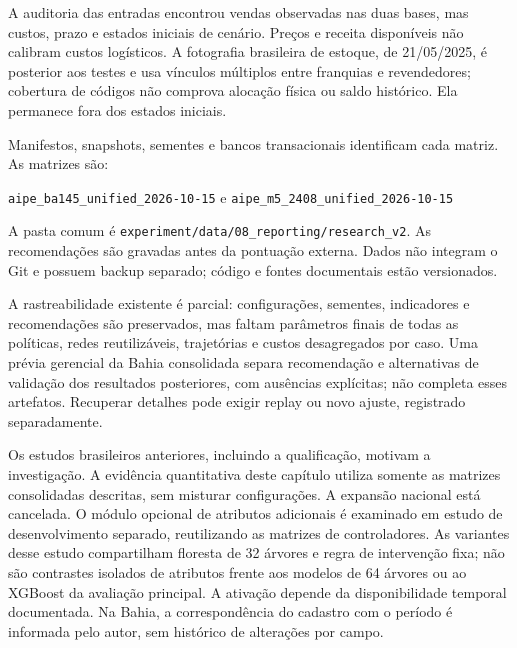 A auditoria das entradas encontrou vendas observadas nas duas bases, mas custos, prazo e estados iniciais de cenário. Preços e receita disponíveis não calibram custos logísticos. A fotografia brasileira de estoque, de 21/05/2025, é posterior aos testes e usa vínculos múltiplos entre franquias e revendedores; cobertura de códigos não comprova alocação física ou saldo histórico. Ela permanece fora dos estados iniciais.

Manifestos, snapshots, sementes e bancos transacionais identificam cada matriz. As matrizes são:\par\begingroup\small\raggedright \nolinkurl{aipe_ba145_unified_2026-10-15} e
\nolinkurl{aipe_m5_2408_unified_2026-10-15}\par\endgroup
A pasta comum é \nolinkurl{experiment/data/08_reporting/research_v2}. As recomendações são gravadas antes da pontuação externa. Dados não integram o Git e possuem backup separado; código e fontes documentais estão versionados.

A rastreabilidade existente é parcial: configurações, sementes, indicadores e recomendações são preservados, mas faltam parâmetros finais de todas as políticas, redes reutilizáveis, trajetórias e custos desagregados por caso. Uma prévia gerencial da Bahia consolidada separa recomendação e alternativas de validação dos resultados posteriores, com ausências explícitas; não completa esses artefatos. Recuperar detalhes pode exigir replay ou novo ajuste, registrado separadamente.

Os estudos brasileiros anteriores, incluindo a qualificação, motivam a investigação. A evidência quantitativa deste capítulo utiliza somente as matrizes consolidadas descritas, sem misturar configurações. A expansão nacional está cancelada. O módulo opcional de atributos adicionais é examinado em estudo de desenvolvimento separado, reutilizando as matrizes de controladores. As variantes desse estudo compartilham floresta de 32 árvores e regra de intervenção fixa; não são contrastes isolados de atributos frente aos modelos de 64 árvores ou ao XGBoost da avaliação principal. A ativação depende da disponibilidade temporal documentada. Na Bahia, a correspondência do cadastro com o período é informada pelo autor, sem histórico de alterações por campo.
